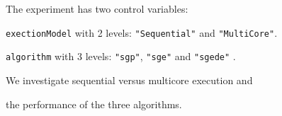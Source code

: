 \begin{frame}
\vspace*{2mm}
\begin{block}{

}
The experiment has two control variables:
 
{\tt exectionModel} with 2 levels: {\tt "Sequential"} and {\tt "MultiCore"}.
 
{\tt algorithm} with 3 levels: {\tt "sgp"}, {\tt "sge"} and {\tt "sgede"} .
 
We investigate sequential versus multicore execution and
 
the performance of the three algorithms.
\end{block}
\end{frame}